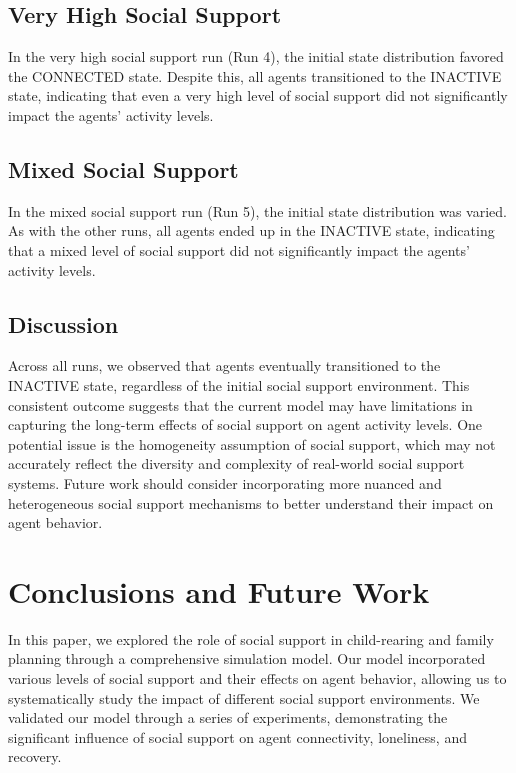 \documentclass{article} %
\begin{document}
\subsection{Very High Social Support}
\label{sec:very_high_support}
In the very high social support run (Run 4), the initial state distribution favored the CONNECTED state. Despite this, all agents transitioned to the INACTIVE state, indicating that even a very high level of social support did not significantly impact the agents' activity levels.

\subsection{Mixed Social Support}
\label{sec:mixed_support}
In the mixed social support run (Run 5), the initial state distribution was varied. As with the other runs, all agents ended up in the INACTIVE state, indicating that a mixed level of social support did not significantly impact the agents' activity levels.

\subsection{Discussion}
\label{sec:discussion}
Across all runs, we observed that agents eventually transitioned to the INACTIVE state, regardless of the initial social support environment. This consistent outcome suggests that the current model may have limitations in capturing the long-term effects of social support on agent activity levels. One potential issue is the homogeneity assumption of social support, which may not accurately reflect the diversity and complexity of real-world social support systems. Future work should consider incorporating more nuanced and heterogeneous social support mechanisms to better understand their impact on agent behavior.

\section{Conclusions and Future Work}
\label{sec:conclusion}

In this paper, we explored the role of social support in child-rearing and family planning through a comprehensive simulation model. Our model incorporated various levels of social support and their effects on agent behavior, allowing us to systematically study the impact of different social support environments. We validated our model through a series of experiments, demonstrating the significant influence of social support on agent connectivity, loneliness, and recovery.
\end{document}
